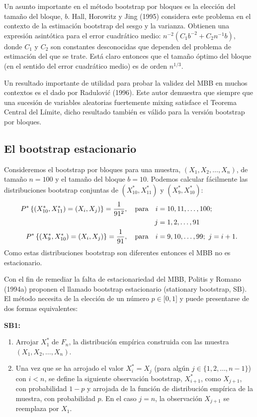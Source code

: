 \documentclass[]{book}
\theoremstyle{definition}
\theoremstyle{definition}
\theoremstyle{definition}
\theoremstyle{remark}
\begin{document}
Un asunto importante en el método bootstrap por bloques es la elección
del tamaño del bloque, \(b\). Hall, Horowitz y Jing (1995) considera
este problema en el contexto de la estimación bootstrap del sesgo y la
varianza. Obtienen una expresión asintótica para el error cuadrático
medio: \(n^{-2}(C_1b^{-2}+C_2n^{-1}b)\), donde \(C_1\) y \(C_2\) son
constantes desconocidas que dependen del problema de estimación del que
se trate. Está claro entonces que el tamaño óptimo del bloque (en el
sentido del error cuadrático medio) es de orden \(n^{1/3}\).

Un resultado importante de utilidad para probar la validez del MBB en
muchos contextos es el dado por Radulović (1996). Este autor demuestra
que siempre que una sucesión de variables aleatorias fuertemente mixing
satisface el Teorema Central del Límite, dicho resultado también es
válido para la versión bootstrap por bloques.

\subsection{El bootstrap estacionario}\label{el-bootstrap-estacionario}

Consideremos el bootstrap por bloques para una muestra,
\((X_1,X_2,\ldots ,X_n)\), de tamaño \(n=100\) y el tamaño del bloque
\(b=10\). Podemos calcular fácilmente las distribuciones bootstrap
conjuntas de \((X_{10}^{\ast},X_{11}^{\ast})\) y
\((X_{9}^{\ast},X_{10}^{\ast})\): \[\begin{aligned}
P^{\ast}\left\{ (X_{10}^{\ast},X_{11}^{\ast})=(X_i,X_j)\right\} =
\frac{1}{91^2},\quad \hbox{para}\quad i &= 10,11,\ldots ,100; \\
j &= 1,2,\ldots ,91 \\
P^{\ast}\left\{ (X_{9}^{\ast},X_{10}^{\ast})=(X_i,X_j)\right\} =\frac{
1}{91},\quad \hbox{para}\quad i &= 9,10,\ldots ,99;\,\,j=i+1.\end{aligned}\]Como
estas distribuciones bootstrap son diferentes entonces el MBB no es
estacionario.

Con el fin de remediar la falta de estacionariedad del MBB, Politis y
Romano (1994a) proponen el llamado bootstrap estacionario (stationary
bootstrap, SB). El método necesita de la elección de un número
\(p\in \lbrack 0,1]\) y puede presentarse de dos formas equivalentes:

\textbf{SB1:}

\begin{enumerate}
\def\labelenumi{\arabic{enumi}.}
\item
  Arrojar \(X_1^{\ast}\) de \(F_n\), la distribución empírica construida
  con las muestra \((X_1,X_2,\ldots ,X_n).\)
\item
  Una vez que se ha arrojado el valor \(X_i^{\ast}=X_j\) (para algún
  \(j\in \{1,2,\ldots ,n-1\}\)) con \(i<n\), se define la siguiente
  observación bootstrap, \(X_{i+1}^{\ast}\), como \(X_{j+1}\), con
  probabilidad \(1-p\) y arrojada de la función de distribución empírica
  de la muestra, con probabilidad \(p\). En el caso \(j=n\), la
  observación \(X_{j+1}\) se reemplaza por \(X_1\).
\end{enumerate}
\end{document}
